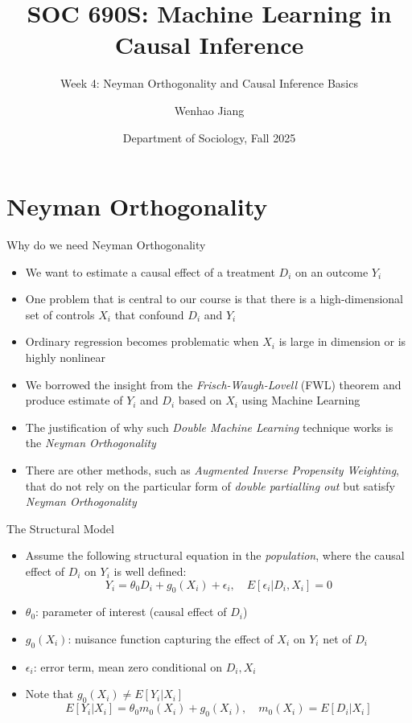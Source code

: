 \documentclass[aspectratio=1610,12pt,xcolor=dvipsnames]{beamer}
\title[CML]{SOC 690S: Machine Learning in Causal Inference\\[1.5pt]}
\subtitle{\large Week 4: Neyman Orthogonality and Causal Inference Basics\\[-10pt]}
\author[Jiang] 
{\large Wenhao Jiang\vspace{-2em}}
\institute[Duke]{}
\date[Duke]
{\large Department of Sociology, Fall 2025}
\begin{document}

\begin{frame}
    \titlepage 
\end{frame}

\section{Neyman Orthogonality}

\begin{frame}
  \sectionpage
\end{frame}

\begin{frame}{Why do we need Neyman Orthogonality}
\begin{itemize}
    \item We want to estimate a causal effect of a treatment $D_i$ on an outcome $Y_i$
    \item One problem that is central to our course is that there is a high-dimensional set of controls $X_i$ that confound $D_i$ and $Y_i$
    \item Ordinary regression becomes problematic when $X_i$ is large in dimension or is highly nonlinear \pause
    \item We borrowed the insight from the \textit{Frisch-Waugh-Lovell} (FWL) theorem and produce estimate of $Y_i$ and $D_i$ based on $X_i$ using Machine Learning
    \item The justification of why such \textit{Double Machine Learning} technique works is the \textit{Neyman Orthogonality}
    \item There are other methods, such as \textit{Augmented Inverse Propensity Weighting}, that do not rely on the particular form of \textit{double partialling out} but satisfy \textit{Neyman Orthogonality}
\end{itemize}
\end{frame}

\begin{frame}{The Structural Model}
\begin{itemize}
    \item Assume the following structural equation in the \textit{population}, where the causal effect of $D_i$ on $Y_i$ is well defined:
    \[
    Y_i = \theta_0 D_i + g_0(X_i) + \epsilon_i, 
    \quad E[\epsilon_i|D_i,X_i]=0
    \]
    \item $\theta_0$: parameter of interest (causal effect of $D_i$)
    \item $g_0(X_i)$: nuisance function capturing the effect of $X_i$ on $Y_i$ net of $D_i$
    \item $\epsilon_i$: error term, mean zero conditional on $D_i, X_i$
    \item Note that $g_0(X_i) \neq E[Y_i|X_i]$
    \[
    E[Y_i|X_i] = \theta_0 m_0(X_i) + g_0(X_i),
    \quad m_0(X_i) = E[D_i|X_i]
    \]
\end{itemize}
\end{frame}
\end{document}
